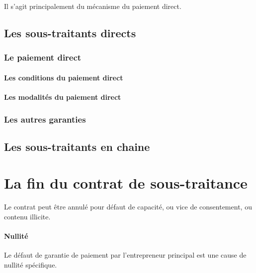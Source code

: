 	Il s'agit principalement du mécanisme du paiement direct.

	\subsection{Les sous-traitants directs}

		\aCompleter

		\subsubsection{Le paiement direct}

			\aCompleter

			\paragraph{Les conditions du paiement direct}

				\aCompleter

			\paragraph{Les modalités du paiement direct}

				\aCompleter

		\subsubsection{Les autres garanties}

			\aCompleter

	\subsection{Les sous-traitants en chaine}

		\aCompleter

\section{La fin du contrat de sous-traitance}

	Le contrat peut être annulé pour défaut de capacité, ou vice de consentement, ou contenu illicite.

	\paragraph{Nullité} Le défaut de garantie de paiement par l’entrepreneur principal est une cause de nullité spécifique.

